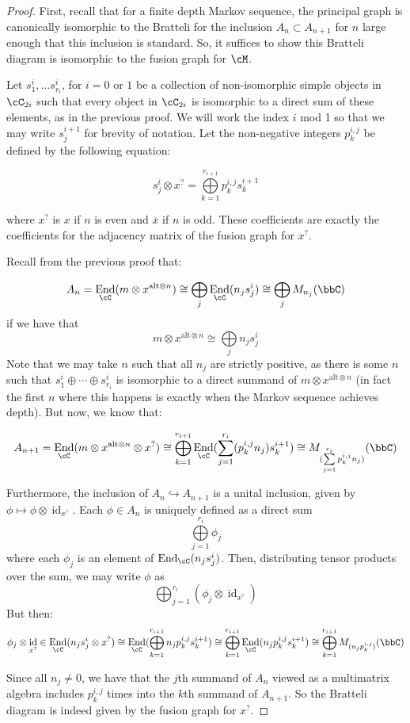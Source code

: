 \documentclass[11pt]{article}
\theoremstyle{plain}
\theoremstyle{definition}
\DeclareMathOperator{\End}{End}
\DeclareMathOperator{\id}{id}
\newcommand{\xalt}{x^{\text{alt}\otimes n}}
\begin{document}
\begin{proof}
First, recall that for a finite depth Markov sequence, the principal graph is canonically isomorphic to the Bratteli for the inclusion $A_n\subset A_{n+1}$ for $n$ large enough that this inclusion is standard. So, it suffices to show this Bratteli diagram is isomorphic to the fusion graph for $\cM$. 

Let $s^i_1,\ldots s^i_{r_i}$, for $i=0$ or $1$ be a collection of non-isomorphic simple objects in $\cC_{2i}$ such that every object in $\cC_{2i}$ is isomorphic to a direct sum of these elements, as in the previous proof. 
	We will work the index $i$ mod 1 so that we may write $s^{i+1}_j$ for brevity of notation. %
	Let the non-negative integers $p^{i,j}_k$ be defined by the following equation:

$$s^i_j\otimes x^{?}=\bigoplus\limits_{k=1}^{r_{i+1}}p^{i,j}_ks^{i+1}_k$$

where $x^{?}$ is $x$ if $n$ is even and $\overline{x}$ if $n$ is odd. %
	These coefficients are exactly the coefficients for the adjacency matrix of the fusion graph for $x^{?}$.

Recall from the previous proof that:

$$A_n=\End_{\cC}(m\otimes\xalt)\cong \bigoplus\limits_{j}\End_{\cC}(n_j s^i_j) \cong \bigoplus\limits_{j}M_{n_j}(\bbC)$$
if we have that 
$$m \otimes \xalt \cong \bigoplus\limits_{j}n_js^i_j$$
Note that we may take $n$ such that all $n_j$ are strictly positive, as there is some $n$ such that $s^{i}_1\oplus\cdots \oplus s^{i}_{r_i}$ is isomorphic to a direct summand of $m\otimes \xalt$ (in fact the first $n$ where this happens is exactly when the Markov sequence achieves depth). But now, we know that:

$$A_{n+1}=\End_{\cC}(m\otimes\xalt\otimes x^{?})\cong \bigoplus\limits_{k=1}^{r_{i+1}}\End_{\cC}(\sum\limits_{j=1}^{r_i}(p^{i,j}_kn_j)s^{i+1}_k)\cong M_{(\sum\limits_{j=1}^{r_i}p^{i,j}_k n_j)}(\bbC)$$

Furthermore, the inclusion of $A_n \hookrightarrow A_{n+1}$ is a unital inclusion, given by $\phi \mapsto \phi \otimes \id_{x^{?}}$. Each $\phi \in A_n$ is uniquely defined as a direct sum 
$$\bigoplus\limits_{j=1}^{r_i}\phi_j$$
where each $\phi_j$ is an element of $\End_{\cC}(n_js^{i}_j)$. Then, distributing tensor products over the sum, we may write $\phi$ as 
$$\bigoplus_{j=1}^{r_i}(\phi_j \otimes \id_{x^{?}})$$
But then:
$$\phi_j \otimes \id_{x^{?}}\in \End_{\cC}(n_js^{i}_j\otimes x^{?})\cong \End_{\cC}(\bigoplus\limits_{k=1}^{r_{i+1}}n_jp^{i,j}_ks^{i+1}_k)\cong \bigoplus\limits_{k=1}^{r_{i+1}}\End_{\cC}(n_jp^{i,j}_ks^{i+1}_k)\cong \bigoplus\limits_{k=1}^{r_{i+1}}M_{(n_jp^{i,j}_k)}(\bbC)$$

Since all $n_j\neq 0$, we have that the $j$th summand of $A_n$ viewed as a multimatrix algebra includes $p^{i,j}_k$ times into the $k$th summand of $A_{n+1}$. So the Bratteli diagram is indeed given by the fusion graph for $x^{?}$.

\end{proof}
\end{document}
